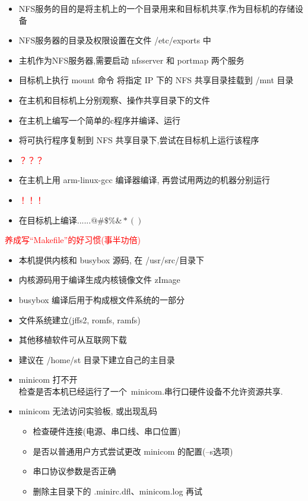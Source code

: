 \begin{itemize}
  \item NFS服务的目的是将主机上的一个目录用来和目标机共享,作为目标机的存储设备
  \item NFS服务器的目录及权限设置在文件 /etc/exports 中
  \item 主机作为NFS服务器,需要启动 nfsserver 和 portmap 两个服务
  \item 目标机上执行 mount 命令 将指定 IP 下的 NFS 共享目录挂载到 /mnt 目录
  \item 在主机和目标机上分别观察、操作共享目录下的文件
\end{itemize}
\endslide

\begin{itemize}
  \item 在主机上编写一个简单的c程序并编译、运行
  \item 将可执行程序复制到 NFS 共享目录下,尝试在目标机上运行该程序
  \item \textcolor{red}{？？？}
  \item 在主机上用 arm-linux-gcc 编译器编译, 再尝试用两边的机器分别运行
  \item \textcolor{red}{！！！}
  \item 在目标机上编译......$\! @\#\$\%\&*()$
\end{itemize}
\textcolor{red}{养成写``Makefile''的好习惯(事半功倍)}
\endslide

\begin{itemize}
  \item 本机提供内核和 busybox 源码, 在 /usr/src/目录下
  \item 内核源码用于编译生成内核镜像文件 zImage
  \item busybox 编译后用于构成根文件系统的一部分
  \item 文件系统建立(jffs2, romfs, ramfs)
  \item 其他移植软件可从互联网下载
  \item 建议在 /home/st 目录下建立自己的主目录
\end{itemize}
\endslide

\begin{itemize}
  \item minicom 打不开\\
		检查是否本机已经运行了一个~minicom.串行口硬件设备不允许资源共享.
  \item minicom 无法访问实验板, 或出现乱码
  \begin{itemize}
	\item 检查硬件连接(电源、串口线、串口位置)
	\item 是否以普通用户方式尝试更改 minicom 的配置(--s选项)
	\item 串口协议参数是否正确
	\item 删除主目录下的 .minirc.dfl、minicom.log 再试
  \end{itemize}
\end{itemize}
\endslide


